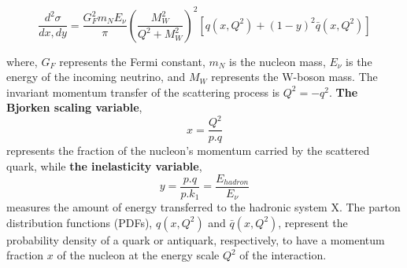 \begin{equation}\label{eq:DIS_xsec_formula}
        \frac{d^2\sigma}{dx,dy} = \frac{G_F^2m_N E_\nu}{\pi} \left(\frac{{M_W^2}}{{Q^2}+{M_W^2}}\right)^2 \left[ q(x,Q^2) + (1-y)^2 \bar{q}(x,Q^2) \right] 
\end{equation}


where, $G_F$ represents the Fermi constant, $m_N$ is the nucleon mass, $E_{\nu}$ is the energy of the incoming neutrino, and $M_W$ represents the W-boson mass. The invariant momentum transfer of the scattering process is $Q^2 = -q^2$. \textbf{The Bjorken scaling variable}, 
\begin{equation}\label{eq:bjorkenx}
        x = \frac{Q^2}{p.q}
\end{equation}
represents the fraction of the nucleon's momentum carried by the scattered quark, while \textbf{the inelasticity variable}, 
\begin{equation}\label{eq:inelasticity}
        y = \frac{p.q}{p.k_1}=\frac{E_{hadron}}{E_{\nu}}
\end{equation}
measures the amount of energy transferred to the hadronic system X. The parton distribution functions (PDFs), $q(x, Q^2)$ and $\bar{q}(x, Q^2)$, represent the probability density of a quark or antiquark, respectively, to have a momentum fraction $x$ of the nucleon at the energy scale $Q^2$ of the interaction. 


